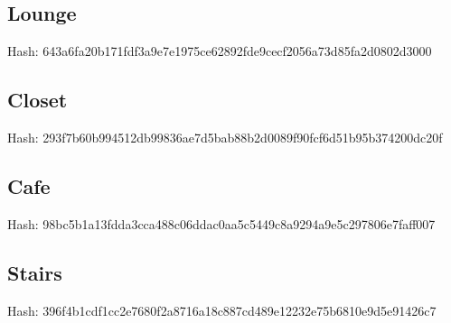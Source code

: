 \subsection{Lounge}
Hash: 643a6fa20b171fdf3a9e7e1975ce62892fde9cecf2056a73d85fa2d0802d3000

\subsection{Closet}
Hash: 293f7b60b994512db99836ae7d5bab88b2d0089f90fcf6d51b95b374200dc20f

\subsection{Cafe}
Hash: 98bc5b1a13fdda3cca488c06ddac0aa5c5449c8a9294a9e5c297806e7faff007

\subsection{Stairs}
Hash: 396f4b1cdf1cc2e7680f2a8716a18c887cd489e12232e75b6810e9d5e91426c7
